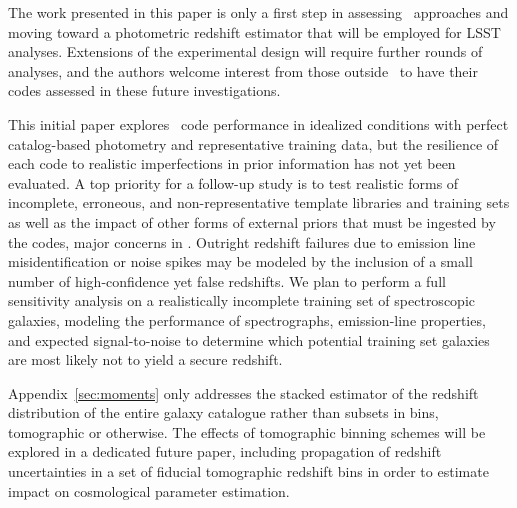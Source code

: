 
The work presented in this paper is only a first step in assessing \pzpdf\ approaches and moving toward a photometric redshift estimator that will be employed for LSST analyses.  Extensions of the experimental design will require further rounds of analyses, and the authors welcome interest from those outside \lsstdesc\ to have their codes assessed in these future investigations.

This initial paper explores \pzpdf\ code performance in idealized conditions with perfect catalog-based photometry and representative training data, but the resilience of each code to realistic imperfections in prior information has not yet been evaluated.
A top priority for a follow-up study is to test realistic forms of incomplete, erroneous, and non-representative template libraries and training sets as well as the impact of other forms of external priors that must be ingested by the codes, major concerns in \citet{newman_spectroscopic_2015, masters_complete_2017}.
Outright redshift failures due to emission line misidentification or noise spikes may be modeled by the inclusion of a small number of high-confidence yet false redshifts.
We plan to perform a full sensitivity analysis on a realistically incomplete training set of spectroscopic galaxies, modeling the performance of spectrographs, emission-line properties, and expected signal-to-noise to determine which potential training set galaxies are most likely not to yield a secure redshift.

Appendix~\ref{sec:moments} only addresses the stacked estimator of the redshift distribution of the entire galaxy catalogue rather than subsets in bins, tomographic or otherwise.
The effects of tomographic binning schemes will be explored in a dedicated future paper, including propagation of redshift uncertainties in a set of fiducial tomographic redshift bins in order to estimate impact on cosmological parameter estimation.

